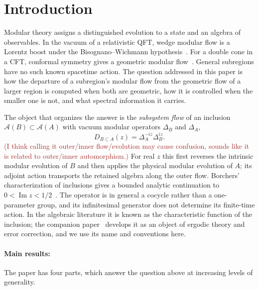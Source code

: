\documentclass[a4paper,11pt]{article}
\theoremstyle{definition}
\newcommand{\KL}[1]{\textcolor{brown}{#1}}
\begin{document}

\section{Introduction}\label{sec:intro}

Modular theory assigns a distinguished evolution to a state and an algebra of observables. In the vacuum of a relativistic QFT, wedge modular flow is a Lorentz boost under the Bisognano--Wichmann hypothesis~\cite{bisognanowichmann}. For a double cone in a CFT, conformal symmetry gives a geometric modular flow~\cite{HislopLongo1982}. General subregions have no such known spacetime action. The question addressed in this paper is how the departure of a subregion's modular flow from the geometric flow of a larger region is computed when both are geometric, how it is controlled when the smaller one is not, and what spectral information it carries.

The object that organizes the answer is the \emph{subsystem flow} of an inclusion $\mathcal A(B)\subset\mathcal A(A)$ with vacuum modular operators $\Delta_B$ and $\Delta_A$,
\begin{equation}
 D_{B\subset A}(z)=\Delta_A^{-iz}\Delta_B^{iz}.
 \label{eq:intro-D}
\end{equation}\KL{(I think calling it outer/inner flow/evolution may cause confusion, sounds like it is related to outer/inner automorphism.)}
For real $z$ this first reverses the intrinsic modular evolution of $B$ and then applies the physical modular evolution of $A$; its adjoint action transports the retained algebra along the outer flow. Borchers' characterization of inclusions gives a bounded analytic continuation to $0<\operatorname{Im}z<1/2$~\cite{revolutionizing}. The operator is in general a cocycle rather than a one-parameter group, and its infinitesimal generator does not determine its finite-time action. In the algebraic literature it is known as the characteristic function of the inclusion; the companion paper~\cite{companion} develops it as an object of ergodic theory and error correction, and we use its name and conventions here.

\paragraph{Main results:}
The paper has four parts, which answer the question above at increasing levels of generality.
\end{document}
